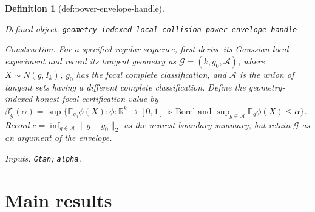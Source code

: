 \documentclass{article}
\newtheorem{definition}{Definition}
\begin{document}
\begin{definition}[def:power-envelope-handle]\label{def:power-envelope-handle}
\par\smallskip\noindent\emph{Defined object.} \texttt{geometry-\allowbreak{}indexed local collision power-\allowbreak{}envelope handle}
\par\smallskip\noindent\emph{Construction.} For a specified regular sequence, first derive its Gaussian local experiment and record its tangent geometry as \(\mathcal G=(k,g_0,\mathcal A)\), where \(X\sim N(g,I_k)\), \(g_0\) has the focal complete classification, and \(\mathcal A\) is the union of tangent sets having a different complete classification.  Define the geometry-indexed honest focal-certification value by \(\beta^{\star}_{\mathcal G}(\alpha)=\sup\{\mathbb E_{g_0}\phi(X):\phi:\mathbb R^k\to[0,1]\text{ is Borel and }\sup_{g\in\mathcal A}\mathbb E_g\phi(X)\le\alpha\}\).  Record \(c=\inf_{g\in\mathcal A}\lVert g-g_0\rVert_2\) as the nearest-boundary summary, but retain \(\mathcal G\) as an argument of the envelope.
\par\smallskip\noindent\emph{Inputs.} \texttt{Gtan}; \texttt{alpha}.
\end{definition}

\section{Main results}
\end{document}
